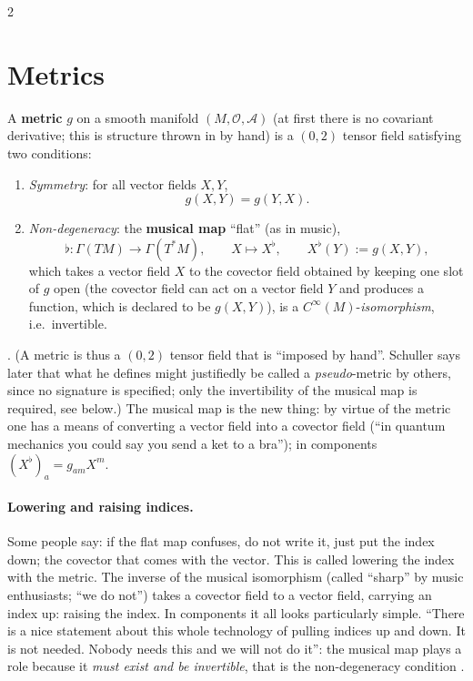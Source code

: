 \begin{paracol}{2}
\section{Metrics}\label{sec:c10-metric}

\begin{definition}\label{def:c10-metric}
A \textbf{metric} $g$ on a smooth manifold $(M,\mathcal O,\mathcal A)$ (at first there is no covariant derivative; this is structure thrown in by hand) is a $(0,2)$ tensor field satisfying two conditions:
\begin{enumerate}
  \item \emph{Symmetry}: for all vector fields $X,Y$,
        \[g(X,Y)=g(Y,X).\]
  \item \emph{Non-degeneracy}: the \textbf{musical map} ``flat'' (as in music),
        \[\flat\colon\Gamma(TM)\to\Gamma(T^*M),\qquad X\mapsto X^\flat,\qquad X^\flat(Y):=g(X,Y),\]
        which takes a vector field $X$ to the covector field obtained by keeping one slot of $g$ open (the covector field can act on a vector field $Y$ and produces a function, which is declared to be $g(X,Y)$), is a $C^\infty(M)$-\emph{isomorphism}, i.e.\ invertible.
\end{enumerate}
\end{definition}
.
(A metric is thus a $(0,2)$ tensor field that is ``imposed by hand''. Schuller says later that what he defines might justifiedly be called a \emph{pseudo}-metric by others, since no signature is specified; only the invertibility of the musical map is required, see below.) The musical map is the new thing: by virtue of the metric one has a means of converting a vector field into a covector field (``in quantum mechanics you could say you send a ket to a bra''); in components $(X^\flat)_a=g_{am}X^m$.

\paragraph{Lowering and raising indices.} Some people say: if the flat map confuses, do not write it, just put the index down; the covector that comes with the vector. This is called lowering the index with the metric. The inverse of the musical isomorphism (called ``sharp'' by music enthusiasts; ``we do not'') takes a covector field to a vector field, carrying an index up: raising the index. In components it all looks particularly simple. ``There is a nice statement about this whole technology of pulling indices up and down. It is not needed. Nobody needs this and we will not do it'': the musical map plays a role because it \emph{must exist and be invertible}, that is the non-degeneracy condition
.


\end{paracol}
